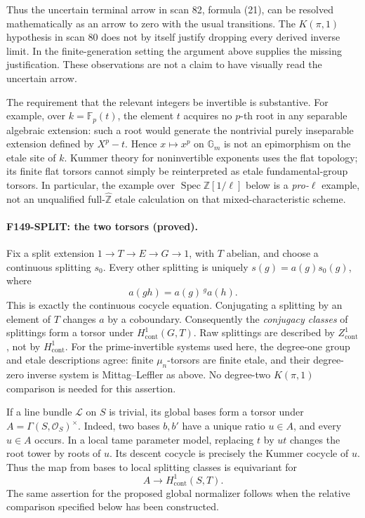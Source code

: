 \documentclass[11pt,a4paper]{article}
\theoremstyle{definition}
\begin{document}
Thus the uncertain terminal arrow in scan 82, formula (21), can be
resolved mathematically as an arrow to zero with the usual transitions.
The \(K(\pi,1)\) hypothesis in scan 80 does not by itself justify dropping
every derived inverse limit.  In the finite-generation setting the
argument above supplies the missing justification.  These observations
are not a claim to have visually read the uncertain arrow.

The requirement that the relevant integers be invertible is substantive.
For example, over \(k=\mathbb F_p(t)\), the element \(t\) acquires no
\(p\)-th root in any separable algebraic extension: such a root would
generate the nontrivial purely inseparable extension defined by
\(X^p-t\).  Hence \(x\mapsto x^p\) on \(\mathbb G_m\) is not an epimorphism
on the etale site of \(k\).  Kummer theory for noninvertible exponents
uses the flat topology; its finite flat torsors cannot simply be
reinterpreted as etale fundamental-group torsors.  In particular, the
example over \(\operatorname{Spec}\mathbb Z[1/\ell]\) below is a
\emph{pro-\(\ell\)} example, not an unqualified full-\(\widehat{\mathbb Z}\)
etale calculation on that mixed-characteristic scheme.

\paragraph{F149-SPLIT: the two torsors (proved).}
Fix a split extension \(1\to T\to E\to G\to1\), with \(T\) abelian,
and choose a continuous splitting \(s_0\).  Every other splitting is
uniquely \(s(g)=a(g)s_0(g)\), where
\[
 a(gh)=a(g)\,{}^ga(h).
\]
This is exactly the continuous cocycle equation.  Conjugating a
splitting by an element of \(T\) changes \(a\) by a coboundary.
Consequently the \emph{conjugacy classes} of splittings form a torsor
under \(H^1_{\mathrm{cont}}(G,T)\).  Raw splittings are described by
\(Z^1_{\mathrm{cont}}\), not by \(H^1_{\mathrm{cont}}\).
For the prime-invertible systems used here, the degree-one group and
etale descriptions agree: finite \(\mu_n\)-torsors are finite etale,
and their degree-zero inverse system is Mittag--Leffler as above.
No degree-two \(K(\pi,1)\) comparison is needed for this assertion.

If a line bundle \(\mathcal L\) on \(S\) is trivial, its global bases form
a torsor under \(A=\Gamma(S,\mathcal O_S)^\times\).  Indeed, two bases
\(b,b'\) have a unique ratio \(u\in A\), and every \(u\in A\) occurs.
In a local tame parameter model, replacing \(t\) by \(ut\) changes the
root tower by roots of \(u\).  Its descent cocycle is precisely the
Kummer cocycle of \(u\).  Thus the map from bases to local splitting
classes is equivariant for
\[
 A\longrightarrow H^1_{\mathrm{cont}}(S,T).
\]
The same assertion for the proposed global normalizer follows when the
relative comparison specified below has been constructed.
\end{document}
